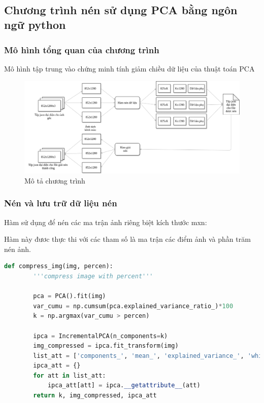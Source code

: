 \
\newpage
\subsection{Chương trình nén sử dụng PCA bằng ngôn ngữ python}
\subsubsection{Mô hình tổng quan của chương trình}

Mô hình tập trung vào chứng minh tính giảm chiều dữ liệu của thuật toán PCA

\begin{center}
    \begin{figure}[htp]
        \begin{center}
            \includegraphics[width=\textwidth,height=\textheight,keepaspectratio]{Chapters/07_DimemsionalityReduction/27_pca/model.png}
        \end{center}
        \caption{Mô tả chương trình}
        \label{fig:27_6}
    \end{figure}
\end{center}

\subsubsection{Nén và lưu trữ dữ liệu nén}

Hàm sử dụng để nén các ma trận ảnh riêng biệt kích thước mxn:


Hàm này đươc thực thi với các tham số  là ma trận các điểm ảnh và phần trăm nén ảnh.
\newpage
\begin{lstlisting}[language=Python]
    def compress_img(img, percen):
        '''compress image with percent'''

        pca = PCA().fit(img)
        var_cumu = np.cumsum(pca.explained_variance_ratio_)*100
        k = np.argmax(var_cumu > percen)

        ipca = IncrementalPCA(n_components=k)
        img_compressed = ipca.fit_transform(img)
        list_att = ['components_', 'mean_', 'explained_variance_', 'whiten']
        ipca_att = {}
        for att in list_att:
            ipca_att[att] = ipca.__getattribute__(att)
        return k, img_compressed, ipca_att
    
\end{lstlisting}

